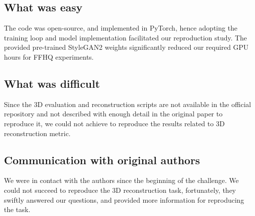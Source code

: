 
\subsection{What was easy}
The code was open-source, and implemented in PyTorch, hence adopting the training loop and model implementation facilitated our reproduction study. The provided pre-trained StyleGAN2 weights significantly reduced our required GPU hours for FFHQ experiments.

\subsection{What was difficult}

Since the 3D evaluation and reconstruction scripts are not available in the official repository and not described with enough detail in the original paper to reproduce it, we could not achieve to reproduce the results related to 3D reconstruction metric. 

\subsection{Communication with original authors}
We were in contact with the authors since the beginning of the challenge. We could not succeed to reproduce the 3D reconstruction task, fortunately, they swiftly answered our questions, and provided more information for reproducing the task.

